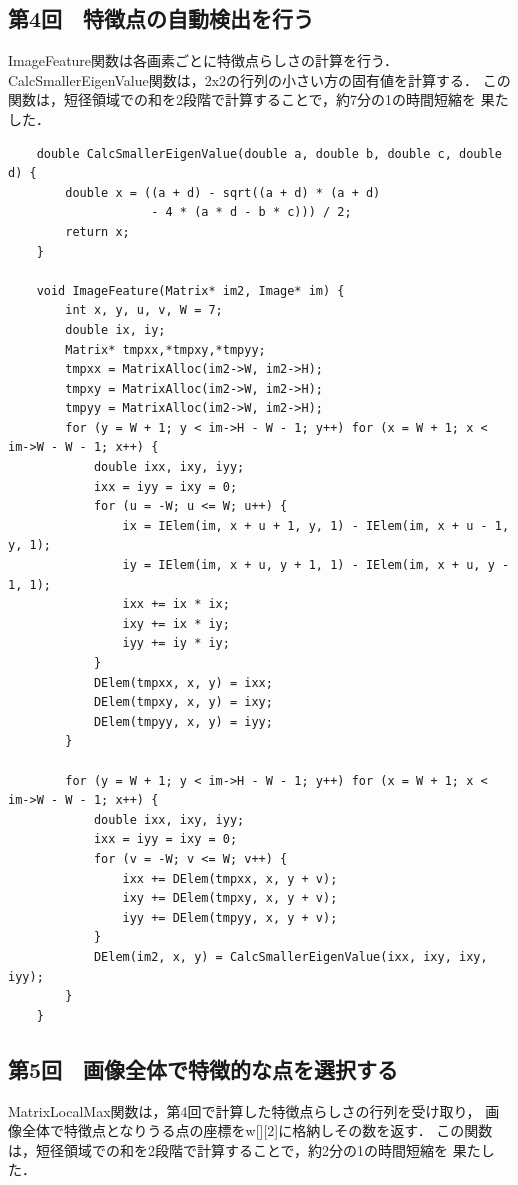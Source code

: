 \documentclass[11pt]{jarticle}
\begin{document}
\subsection{第4回　特徴点の自動検出を行う}

ImageFeature関数は各画素ごとに特徴点らしさの計算を行う．
CalcSmallerEigenValue関数は，2x2の行列の小さい方の固有値を計算する．
この関数は，短径領域での和を2段階で計算することで，約7分の1の時間短縮を
果たした．

\begin{lstlisting}
    double CalcSmallerEigenValue(double a, double b, double c, double d) {
        double x = ((a + d) - sqrt((a + d) * (a + d) 
                    - 4 * (a * d - b * c))) / 2;
        return x;
    }
    
    void ImageFeature(Matrix* im2, Image* im) {
        int x, y, u, v, W = 7;
        double ix, iy;
        Matrix* tmpxx,*tmpxy,*tmpyy;
        tmpxx = MatrixAlloc(im2->W, im2->H);
        tmpxy = MatrixAlloc(im2->W, im2->H);
        tmpyy = MatrixAlloc(im2->W, im2->H);
        for (y = W + 1; y < im->H - W - 1; y++) for (x = W + 1; x < im->W - W - 1; x++) {
            double ixx, ixy, iyy;
            ixx = iyy = ixy = 0;
            for (u = -W; u <= W; u++) {
                ix = IElem(im, x + u + 1, y, 1) - IElem(im, x + u - 1, y, 1);
                iy = IElem(im, x + u, y + 1, 1) - IElem(im, x + u, y - 1, 1);
                ixx += ix * ix;
                ixy += ix * iy;
                iyy += iy * iy;
            }
            DElem(tmpxx, x, y) = ixx;
            DElem(tmpxy, x, y) = ixy;
            DElem(tmpyy, x, y) = iyy;
        }

        for (y = W + 1; y < im->H - W - 1; y++) for (x = W + 1; x < im->W - W - 1; x++) {
            double ixx, ixy, iyy;
            ixx = iyy = ixy = 0;
            for (v = -W; v <= W; v++) {
                ixx += DElem(tmpxx, x, y + v);
                ixy += DElem(tmpxy, x, y + v);
                iyy += DElem(tmpyy, x, y + v);
            }
            DElem(im2, x, y) = CalcSmallerEigenValue(ixx, ixy, ixy, iyy);
        }
    }
\end{lstlisting}

\subsection{第5回　画像全体で特徴的な点を選択する}

MatrixLocalMax関数は，第4回で計算した特徴点らしさの行列を受け取り，
画像全体で特徴点となりうる点の座標をw[][2]に格納しその数を返す．
この関数は，短径領域での和を2段階で計算することで，約2分の1の時間短縮を
果たした．
\end{document}
